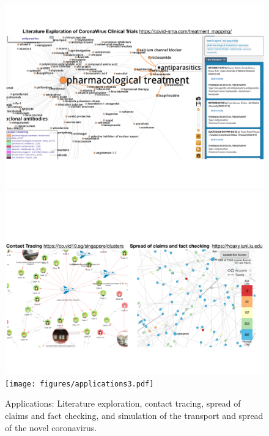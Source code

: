 \documentclass[10pt,journal,compsoc]{IEEEtran}
\begin{document}
\begin{figure}
	\includegraphics[width=\textwidth]{figures/applications1.pdf}
	\includegraphics[width=\linewidth]{figures/applications2.pdf}
	\texttt{[image: figures/applications3.pdf]}
	\caption{Applications: Literature exploration, contact tracing, spread of claims and fact checking, and simulation of the transport and spread of the novel coronavirus.}
	\label{fig:applications}
\end{figure}
\end{document}
